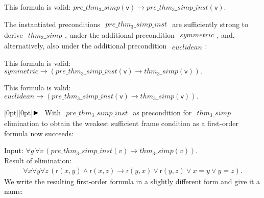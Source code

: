 \documentclass[a4paper]{article}
\newcommand{\imp}{\rightarrow}
\newcommand{\pplmacro}[1]{\mathit{#1}}
\newcommand{\pplIsValid}[1]{\noindent This formula is valid: $#1$\par}
\newcommand{\highlightpar}{\noindent\raisebox{0.2ex}[0pt][0pt]{$\blacktriangleright\hspace{0.8em}$}}
\begin{document}
  \smallskip
\pplIsValid{\pplmacro{pre\_thm_{3}\_simp}(\mathsf{v}) \imp  \pplmacro{pre\_thm_{3}\_simp\_inst}(\mathsf{v}).}
%
%
  
  \medskip \noindent The instantiated preconditions
  $\begin{array}{l}
\pplmacro{pre\_thm_{3}\_simp\_inst}
\end{array}
$ are sufficiently strong to derive
  $\begin{array}{l}
\pplmacro{thm_{3}\_simp}
\end{array}
$, under the additional precondition
  $\begin{array}{l}
\pplmacro{symmetric}
\end{array}
$, and, alternatively, also under the additional
  precondition $\begin{array}{l}
\pplmacro{euclidean}
\end{array}
$:

  \smallskip
\pplIsValid{\pplmacro{symmetric} \imp  (\pplmacro{pre\_thm_{3}\_simp\_inst}(\mathsf{v}) \imp  \pplmacro{thm_{3}\_simp}(\mathsf{v})).}
\pplIsValid{\pplmacro{euclidean} \imp  (\pplmacro{pre\_thm_{3}\_simp\_inst}(\mathsf{v}) \imp  \pplmacro{thm_{3}\_simp}(\mathsf{v})).}
%
%
  \medskip \highlightpar With $\begin{array}{l}
\pplmacro{pre\_thm_{3}\_simp\_inst}
\end{array}
$ as
  precondition for $\begin{array}{l}
\pplmacro{thm_{3}\_simp}
\end{array}
$ elimination to obtain the
  weakest sufficient frame condition as a first-order formula now succeeds:

  \smallskip

\noindent Input: $\forall \mathit{g} \, \forall \mathit{v} \, (\pplmacro{pre\_thm_{3}\_simp\_inst}(\mathit{v}) \imp  \pplmacro{thm_{3}\_simp}(\mathit{v})).$\\
\noindent Result of elimination:
\[\begin{array}{lllll}
\forall \mathit{x} \forall \mathit{y} \forall \mathit{z} \, (\mathsf{r}(\mathit{x},\mathit{y}) \land  \mathsf{r}(\mathit{x},\mathit{z}) \imp  \mathsf{r}(\mathit{y},\mathit{x}) \lor  \mathsf{r}(\mathit{y},\mathit{z}) \lor  \mathit{x}=\mathit{y} \lor  \mathit{y}=\mathit{z}).
\end{array}
\]
%
%
  \noindent We write the resulting first-order formula in a slightly different
  form and give it a name:
\end{document}
